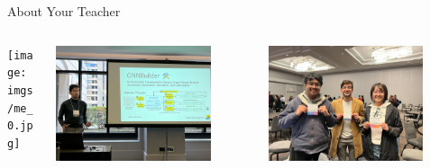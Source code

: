 \documentclass[aspectratio=169]{beamer}
\begin{document}
\begin{frame}{About Your Teacher}
    \begin{columns}[t]
        \begin{column}{0.33\textwidth}
            \centering
            \texttt{[image: imgs/me\_0.jpg]}
        \end{column}
        \begin{column}{0.33\textwidth}
            \centering
            \includegraphics[width=0.8\textwidth]{imgs/me_1.jpg}
        \end{column}
        \begin{column}{0.33\textwidth}
            \centering
            \includegraphics[width=0.8\textwidth]{imgs/me_2.jpg}
        \end{column}
    \end{columns}
\end{frame}
\end{document}
